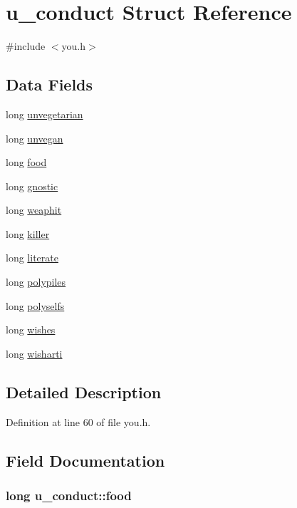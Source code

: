 \hypertarget{structu__conduct}{\section{u\+\_\+conduct Struct Reference}
\label{structu__conduct}
}


{\ttfamily \#include $<$you.\+h$>$}

\subsection*{Data Fields}
\begin{DoxyCompactItemize}
\item 
long \hyperlink{structu__conduct_af43373262632e43fc206cb7ee97e1720}{unvegetarian}
\item 
long \hyperlink{structu__conduct_a3f98bca389fa71f4dabbd75829719dbf}{unvegan}
\item 
long \hyperlink{structu__conduct_a2d5d295afd232b076220ca486b720ed1}{food}
\item 
long \hyperlink{structu__conduct_adb446fda8db21ba87c4dccfc6e7c75e6}{gnostic}
\item 
long \hyperlink{structu__conduct_a5faa37ddcce277ff9f9d27de1132673b}{weaphit}
\item 
long \hyperlink{structu__conduct_a8d10ce4f9c867d2fdc4656e06ab28582}{killer}
\item 
long \hyperlink{structu__conduct_a77dfbeafba9b3246900584c73eded17d}{literate}
\item 
long \hyperlink{structu__conduct_a58879573cbdba47a68e09699703d926e}{polypiles}
\item 
long \hyperlink{structu__conduct_a50d1cae6a56126251070944e2d3ec3ff}{polyselfs}
\item 
long \hyperlink{structu__conduct_af0937aebdb697b63a7572cb74463aeae}{wishes}
\item 
long \hyperlink{structu__conduct_a07e1d6718f1275907e2d1be5274974d0}{wisharti}
\end{DoxyCompactItemize}


\subsection{Detailed Description}


Definition at line 60 of file you.\+h.



\subsection{Field Documentation}
\hypertarget{structu__conduct_a2d5d295afd232b076220ca486b720ed1}{
\subsubsection[{food}]{\setlength{\rightskip}{0pt plus 5cm}long u\+\_\+conduct\+::food}}\label{structu__conduct_a2d5d295afd232b076220ca486b720ed1}


